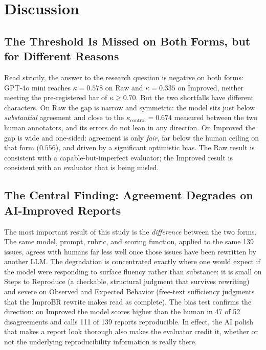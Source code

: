 \section{Discussion}
\label{sec:discussion}

\subsection{The Threshold Is Missed on Both Forms, but for Different Reasons}
\label{subsec:disc-finding}

Read strictly, the answer to the research question is negative on both forms:
GPT-4o mini reaches $\kappa = 0.578$ on Raw and $\kappa = 0.335$ on Improved,
neither meeting the pre-registered bar of $\kappa \geq 0.70$. But the two
shortfalls have different characters. On Raw the gap is narrow and symmetric:
the model sits just below \emph{substantial} agreement and close to the
$\kappa_{\text{control}} = 0.674$ measured between the two human annotators, and
its errors do not lean in any direction. On Improved the gap is wide and
one-sided: agreement is only \emph{fair}, far below the human ceiling on that
form ($0.556$), and driven by a significant optimistic bias. The Raw result is
consistent with a capable-but-imperfect evaluator; the Improved result is
consistent with an evaluator that is being misled.

\subsection{The Central Finding: Agreement Degrades on AI-Improved Reports}
\label{subsec:disc-gap}

The most important result of this study is the \emph{difference} between the two
forms. The same model, prompt, rubric, and scoring function, applied to the same
139 issues, agrees with humans far less well once those issues have been
rewritten by another LLM. The degradation is concentrated exactly where one
would expect if the model were responding to surface fluency rather than
substance: it is small on Steps to Reproduce (a checkable, structural judgment
that survives rewriting) and severe on Observed and Expected Behavior (free-text
sufficiency judgments that the ImproBR rewrite makes read as complete). The
bias test confirms the direction: on Improved the model scores higher than the
human in 47 of 52 disagreements and calls 111 of 139 reports reproducible. In
effect, the AI polish that makes a report look thorough also makes the evaluator
credit it, whether or not the underlying reproducibility information is really
there.


